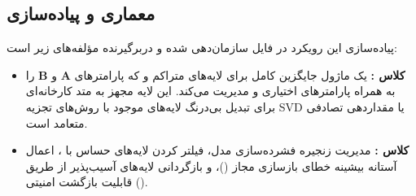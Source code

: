 \subsection{معماری و پیاده‌سازی}
پیاده‌سازی این رویکرد در فایل  سازمان‌دهی شده و دربرگیرنده مؤلفه‌های زیر است:
\begin{itemize}
    \item \textbf{کلاس :} یک ماژول جایگزین کامل برای لایه‌های متراکم و  که پارامترهای $\mathbf{A}$ و $\mathbf{B}$ را به همراه پارامترهای اختیاری  و  مدیریت می‌کند. این لایه مجهز به متد کارخانه‌ای  برای تبدیل بی‌درنگ لایه‌های موجود با روش‌های تجزیه SVD یا مقداردهی تصادفی متعامد است.
    \item \textbf{کلاس :} مدیریت زنجیره فشرده‌سازی مدل، فیلتر کردن لایه‌های حساس با ، اعمال آستانه بیشینه خطای بازسازی مجاز ()، و بازگردانی لایه‌های آسیب‌پذیر از طریق قابلیت بازگشت امنیتی ().
\end{itemize}

